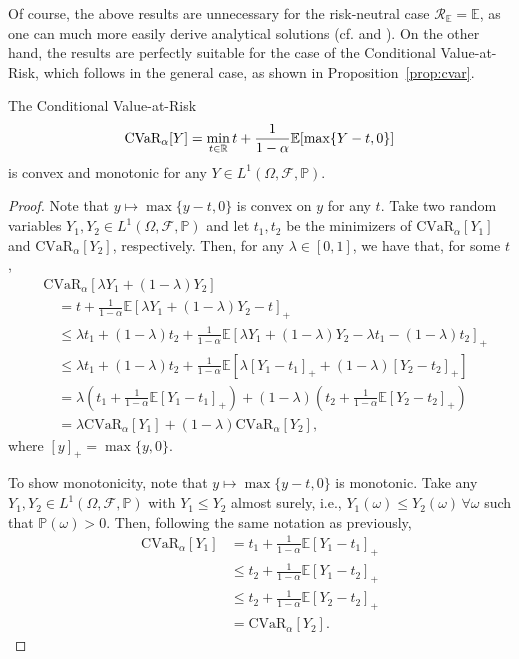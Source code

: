 \documentclass[12pt]{article}
\begin{document}
Of course, the above results are unnecessary for the risk-neutral case $\mathcal{R}_{\mathbb{E}}= \mathbb{E}$, as one can much more easily derive analytical solutions (cf. \citet[Chapter~1.e]{birgeIntroductionStochasticProgramming2011} and \citet[Chapter~1.2.1]{shapiroLecturesStochasticProgramming2009}).
On the other hand, the results are perfectly suitable for the case of the Conditional Value-at-Risk, which follows in the general case, as shown in Proposition~\ref{prop:cvar}.

\begin{prop}\label{prop:cvar}
    The Conditional Value-at-Risk \[
	\text{CVaR}_\alpha[Y] = \min_{t\in \mathbb{R}} t + \frac{1}{1-\alpha} \mathbb{E}[\max\{Y-t,0\}]
    \] is convex and monotonic for any $Y \in L^{1}(\Omega,\mathcal{F},\mathbb{P})$.
\end{prop}
\begin{proof}
    Note that $y \mapsto \max\{y-t,0\}$ is convex on $y$ for any $t$.
    Take two random variables $Y_1,Y_2 \in L^{1}(\Omega,\mathcal{F},\mathbb{P})$ and let $t_1,t_2$ be the minimizers of $\text{CVaR}_{\alpha}[Y_1]$ and $\text{CVaR}_{\alpha}[Y_2]$, respectively.
    Then, for any $\lambda \in [0,1]$, we have that, for some $t$,
    \begin{align*}
	&\text{CVaR}_{\alpha}[\lambda Y_1 + (1-\lambda)Y_2] \\
	&\quad = t + \frac{1}{1-\alpha} \mathbb{E}[\lambda Y_1 + (1-\lambda)Y_2 - t]_{+}  \\
	&\quad \le \lambda t_1 + (1-\lambda)t_2 + \frac{1}{1-\alpha} \mathbb{E}[\lambda Y_1 + (1-\lambda)Y_2 - \lambda t_1 - (1-\lambda)t_2]_{+}  \\
	&\quad \le \lambda t_1 + (1-\lambda)t_2 + \frac{1}{1-\alpha} \mathbb{E}[\lambda [Y_1 - t_1]_{+} + (1-\lambda)[Y_2 - t_2]_{+} ]  \\
	&\quad = \lambda \left( t_1 + \frac{1}{1-\alpha} \mathbb{E}[Y_1 - t_1]_{+} \right)  + (1-\lambda) \left( t_2 + \frac{1}{1-\alpha} \mathbb{E}[Y_2 - t_2]_{+} \right)   \\
	&\quad = \lambda \text{CVaR}_{\alpha}[Y_1] + (1-\lambda)\text{CVaR}_{\alpha}[Y_2]
,\end{align*}
where $[y]_{+} = \max\{y,0\}$.
    
    To show monotonicity, note that $y \mapsto \max\{y-t,0\}$ is monotonic.
    Take any $Y_1,Y_2 \in L^{1}(\Omega,\mathcal{F},\mathbb{P})$ with $Y_1 \le Y_2$ almost surely, i.e., $Y_1(\omega) \le Y_2(\omega)\,\forall \omega$  such that $\mathbb{P}(\omega)>0$.
    Then, following the same notation as previously, 
    \begin{align*}
	\text{CVaR}_{\alpha}[Y_1] &= t_1 + \frac{1}{1-\alpha}\mathbb{E}[Y_1-t_1]_+ \\
	&\le  t_2 + \frac{1}{1-\alpha}\mathbb{E}[Y_1-t_2]_+ \\
	&\le  t_2 + \frac{1}{1-\alpha}\mathbb{E}[Y_2-t_2]_+ \\
	&=  \text{CVaR}_{\alpha}[Y_2]
    .\end{align*}
\end{proof}
\end{document}

